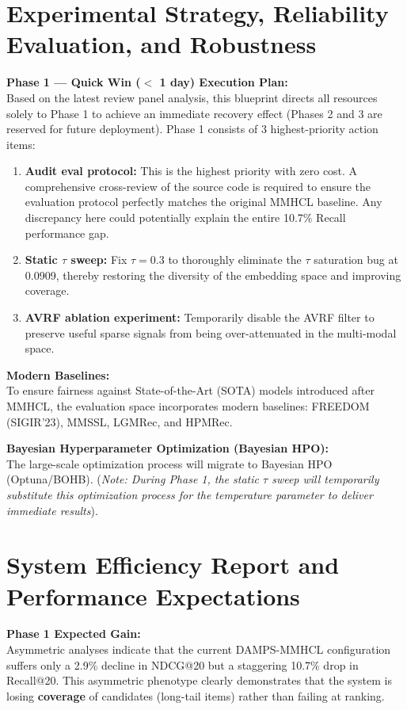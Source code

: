 \documentclass[12pt, a4paper]{article}
\begin{document}
\section{Experimental Strategy, Reliability Evaluation, and Robustness}

\noindent \textbf{Phase 1 — Quick Win ($<$ 1 day) Execution Plan:} \\
Based on the latest review panel analysis, this blueprint directs all resources solely to Phase 1 to achieve an immediate recovery effect (Phases 2 and 3 are reserved for future deployment). Phase 1 consists of 3 highest-priority action items:
\begin{enumerate}
    \item \textbf{Audit eval protocol:} This is the highest priority with zero cost. A comprehensive cross-review of the source code is required to ensure the evaluation protocol perfectly matches the original MMHCL baseline. Any discrepancy here could potentially explain the entire 10.7\% Recall performance gap.
    \item \textbf{Static $\tau$ sweep:} Fix $\tau = 0.3$ to thoroughly eliminate the $\tau$ saturation bug at 0.0909, thereby restoring the diversity of the embedding space and improving coverage.
    \item \textbf{AVRF ablation experiment:} Temporarily disable the AVRF filter to preserve useful sparse signals from being over-attenuated in the multi-modal space.
\end{enumerate}

\noindent \textbf{Modern Baselines:} \\
To ensure fairness against State-of-the-Art (SOTA) models introduced after MMHCL, the evaluation space incorporates modern baselines: FREEDOM (SIGIR'23), MMSSL, LGMRec, and HPMRec.

\noindent \textbf{Bayesian Hyperparameter Optimization (Bayesian HPO):} \\
The large-scale optimization process will migrate to Bayesian HPO (Optuna/BOHB). (\textit{Note: During Phase 1, the static $\tau$ sweep will temporarily substitute this optimization process for the temperature parameter to deliver immediate results}).

\section{System Efficiency Report and Performance Expectations}

\noindent \textbf{Phase 1 Expected Gain:} \\
Asymmetric analyses indicate that the current DAMPS-MMHCL configuration suffers only a 2.9\% decline in NDCG@20 but a staggering 10.7\% drop in Recall@20. This asymmetric phenotype clearly demonstrates that the system is losing \textbf{coverage} of candidates (long-tail items) rather than failing at ranking.
\end{document}
